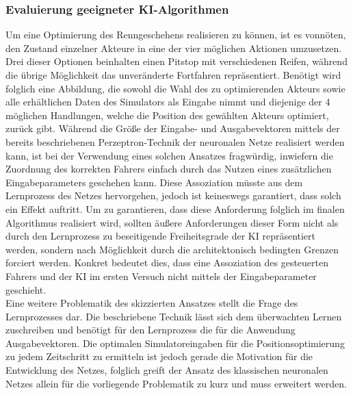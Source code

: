 \subsubsection{Evaluierung geeigneter KI-Algorithmen}
Um eine Optimierung des Renngeschehens realisieren zu können, ist es vonnöten, den Zustand einzelner Akteure in eine der vier möglichen Aktionen umzusetzen. Drei dieser Optionen beinhalten einen Pitstop mit verschiedenen Reifen, während die übrige Möglichkeit das unveränderte Fortfahren repräsentiert. Benötigt wird folglich eine Abbildung, die sowohl die Wahl des zu optimierenden Akteurs sowie alle erhältlichen Daten des Simulators als Eingabe nimmt und diejenige der 4 möglichen Handlungen, welche die Position des gewählten Akteurs optimiert, zurück gibt. Während die Größe der Eingabe- und Ausgabevektoren mittels der bereits beschriebenen Perzeptron-Technik der neuronalen Netze realisiert werden kann, ist bei der Verwendung eines solchen Ansatzes fragwürdig, inwiefern die Zuordnung des korrekten Fahrers einfach durch das Nutzen eines zusätzlichen Eingabeparameters geschehen kann. Diese Assoziation müsste aus dem Lernprozess des Netzes hervorgehen, jedoch ist keineswegs garantiert, dass solch ein Effekt auftritt. Um zu garantieren, dass diese Anforderung folglich im finalen Algorithmus realisiert wird, sollten äußere Anforderungen dieser Form nicht als durch den Lernprozess zu beseitigende Freiheitsgrade der KI repräsentiert werden, sondern nach Möglichkeit durch die architektonisch bedingten Grenzen forciert werden. Konkret bedeutet dies, dass eine Assoziation des gesteuerten Fahrers und der KI im ersten Versuch nicht mittels der Eingabeparameter geschieht.\\
Eine weitere Problematik des skizzierten Ansatzes stellt die Frage des Lernprozesses dar. Die beschriebene Technik lässt sich dem überwachten Lernen zuschreiben und benötigt für den Lernprozess die für die Anwendung  Ausgabevektoren. Die optimalen Simulatoreingaben für die Positionsoptimierung zu jedem Zeitschritt zu ermitteln ist jedoch gerade die Motivation für die Entwicklung des Netzes, folglich greift der Ansatz des klassischen neuronalen Netzes allein für die vorliegende Problematik zu kurz und muss erweitert werden.\\

